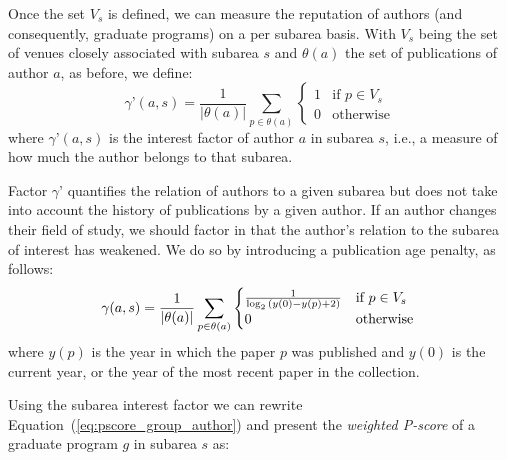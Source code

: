 \documentclass[msc]{ppgccufmg}
\begin{document}
Once the set $V_{s}$ is defined, we can measure the reputation of authors (and consequently, graduate programs) on a per subarea basis. 
%
With $V_{s}$ being the set of venues closely associated with subarea $s$ and $\theta(a)$ the set of publications of author $a$,  as before, we define:
\begin{equation}\label{eq:author_factor}
    \gamma\text{'}(a,s) = \frac{1}{|\theta(a)|} \sum_{p \in \theta(a)}
    \begin{cases}
         1 & \mbox{if $p \in V_{s}$}\\ 
         0 & \mbox{otherwise} 
    \end{cases}
\end{equation}
where $\gamma\text{'}(a,s)$ is the interest factor of author $a$ in subarea $s$, i.e., a measure of how much the author belongs to that subarea.

Factor $\gamma\text{'}$ quantifies the relation of authors to a given subarea but does not take into account the history of publications by a given author. If an author changes their field of study, we should factor in that the author's relation to the subarea of interest has weakened. We do so by introducing a publication age penalty, as follows:
\begin{equation}\label{eq:author_factor_year}
    \gamma(a,s) = \frac{1}{|\theta(a)|} \sum_{p \in \theta(a)}
    \begin{cases}
      \frac{1}{\log_2 {(y(0) - y(p) + 2)}} & \mbox{if $p \in V_{s}$} \\
      0 & \mbox{otherwise} 
    \end{cases} \\ %
\end{equation}
where $y(p)$ is the year in which the paper $p$ was published and $y(0)$ is the current year, or the year of the most recent paper in the collection. 

Using the subarea interest factor we can rewrite Equation~(\ref{eq:pscore_group_author}) and present the \textit{weighted P-score} of a graduate program $\textit{g}$ in subarea $\textit{s}$ as:
\end{document}
